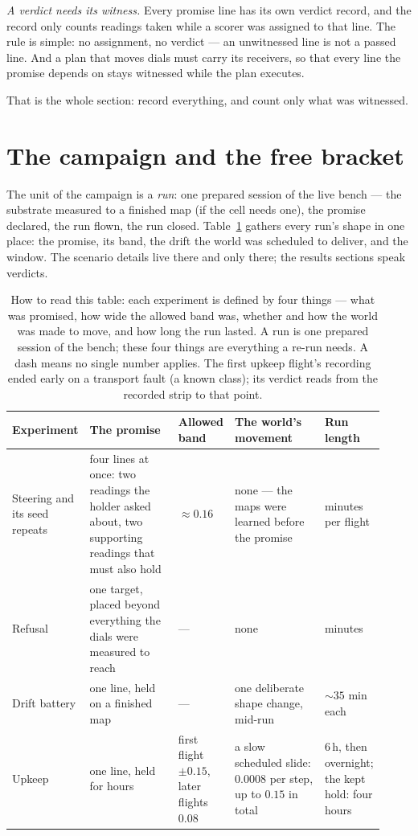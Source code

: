 \documentclass[11pt,a4paper]{article}
\begin{document}
\emph{A verdict needs its witness.} Every promise line has its own
verdict record, and the record only counts readings taken while a
scorer was assigned to that line. The rule is simple: no assignment,
no verdict --- an unwitnessed line is not a passed line. And a plan
that moves dials must carry its receivers, so that every line the
promise depends on stays witnessed while the plan executes.

That is the whole section: record everything, and count only what
was witnessed.

\section{The campaign and the free bracket}
\label{sec:campaign}

The unit of the campaign is a \emph{run}: one prepared session of
the live bench --- the substrate measured to a finished map (if the
cell needs one), the promise declared, the run flown, the run
closed. Table~\ref{tab:shape} gathers every run's shape in one
place: the promise, its band, the drift the world was scheduled to
deliver, and the window. The scenario details live there and only
there; the results sections speak verdicts.

\begin{table}[!ht]
\centering
\small
\begin{tabular}{@{}p{0.14\linewidth}p{0.26\linewidth}p{0.14\linewidth}p{0.26\linewidth}p{0.12\linewidth}@{}}
\toprule
\textbf{Experiment} & \textbf{The promise} & \textbf{Allowed band} &
\textbf{The world's movement} & \textbf{Run length} \\
\midrule
Steering and its seed repeats & four lines at once: two readings the
holder asked about, two supporting readings that must also hold &
$\approx 0.16$ & none --- the maps were learned before the promise
& minutes per flight \\
Refusal & one target, placed beyond everything the dials were
measured to reach & --- & none & minutes \\
Drift battery & one line, held on a finished map & --- & one
deliberate shape change, mid-run & ${\sim}35$ min each \\
Upkeep & one line, held for hours & first flight $\pm 0.15$, later
flights $0.08$ & a slow scheduled slide: $0.0008$ per step, up to
$0.15$ in total & 6\,h, then overnight; the kept hold: four hours \\
\bottomrule
\end{tabular}
\caption{How to read this table: each experiment is defined by four
things --- what was promised, how wide the allowed band was, whether
and how the world was made to move, and how long the run lasted. A
run is one prepared session of the bench; these four things are
everything a re-run needs. A dash means no single number applies.
The first upkeep flight's recording ended early on a transport fault
(a known class); its verdict reads from the recorded strip to that
point.}
\label{tab:shape}
\end{table}
\end{document}
